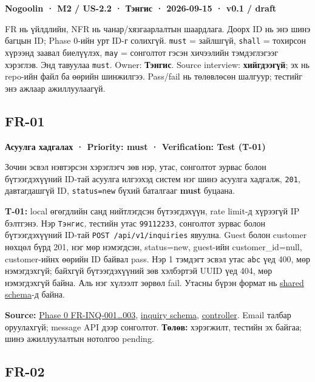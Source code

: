 \documentclass[
  11pt,
  a4paper,
]{article}
\begin{document}
\textbf{Nogoolin · M2 / US-2.2 · Тэнгис · 2026-09-15 · v0.1 / draft}

FR нь үйлдлийн, NFR нь чанар/хязгаарлалтын шаардлага. Доорх ID нь энэ
шинэ багцын ID; Phase 0-ийн урт ID-г солихгүй. \nolinkurl{must} =
зайлшгүй, \nolinkurl{shall} = тохирсон хүрээнд заавал биелүүлэх,
\nolinkurl{may} = сонголтот гэсэн хичээлийн тэмдэглэгээг хэрэглэв. Энд
тавуулаа \nolinkurl{must}. Owner: \textbf{Тэнгис}. Source interview:
\textbf{хийгдээгүй}; эх нь repo-ийн файл ба өөрийн шинжилгээ. Pass/fail
нь төлөвлөсөн шалгуур; тестийг энэ ажлаар ажиллуулаагүй.

\subsection{FR-01}\label{doc4-fr-01}

\textbf{Асуулга хадгалах · Priority: must · Verification: Test (T-01)}

Зочин эсвэл нэвтэрсэн хэрэглэгч зөв нэр, утас, сонголтот зурвас болон
бүтээгдэхүүний ID-тай асуулга илгээхэд систем нэг шинэ асуулга хадгалж,
\nolinkurl{201}, давтагдашгүй ID, \nolinkurl{status=new} бүхий баталгааг
\textbf{must} буцаана.

\textbf{T-01:} local өгөгдлийн санд нийтлэгдсэн бүтээгдэхүүн, rate
limit-д хүрээгүй IP бэлтгэнэ. Нэр \nolinkurl{Тэнгис}, тестийн утас
\nolinkurl{99112233}, сонголтот зурвас болон бүтээгдэхүүний ID-тай
\nolinkurl{POST /api/v1/inquiries} явуулна. Guest болон customer нөхцөл
бүрд 201, нэг мөр нэмэгдсэн, status=new, guest-ийн customer\_id=null,
customer-ийнх өөрийн ID байвал pass. Нэр 1 тэмдэгт эсвэл утас
\nolinkurl{abc} үед 400, мөр нэмэгдэхгүй; байхгүй бүтээгдэхүүний зөв
хэлбэртэй UUID үед 404, мөр нэмэгдэхгүй байна. Аль нэг хүлээлт зөрвөл
fail. Утасны бүрэн формат нь
\href{../../../packages/validation-schemas/src/common.ts}{shared
schema}-д байна.

\textbf{Source:} \href{../../phase-0/02-requirements.md}{Phase 0
FR-INQ-001\ldots003},
\href{../../../packages/validation-schemas/src/inquiry.schema.ts}{inquiry
schema},
\href{../../../backend/api/src/controllers/inquiry.controller.ts}{controller}.
Email талбар оруулахгүй; message API дээр сонголтот. \textbf{Төлөв:}
хэрэгжилт, тестийн эх байгаа; шинэ ажиллуулалтын нотолгоо pending.

\subsection{FR-02}\label{doc4-fr-02}
\end{document}

